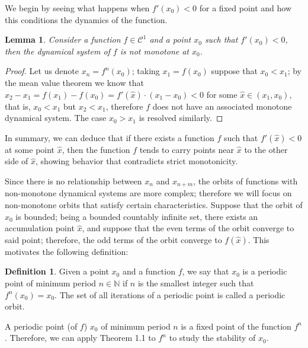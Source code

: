\documentclass[12pt,a4paper]{report}
\newtheorem{lema}{Lemma}[section]
\theoremstyle{definition}
\newtheorem{definicion}{Definition}[section]
\begin{document}
We begin by seeing what happens when $f'(x_0) < 0$ for a fixed point and how this conditions the dynamics of the function.

\begin{lema}
    
Consider a function \( f \in \mathcal{C}^1 \) and a point $x_0$ such that \( f'(x_0) < 0 \), then the dynamical system of $f$ is not monotone at $x_0$.

\end{lema}

\begin{proof}
 Let us denote $x_n = f^n(x_0)$; taking $x_1 = f(x_0)$ suppose that $x_0 < x_1$; by the mean value theorem we know that $x_{2} - x_1 = f(x_1) - f(x_{0}) = f'(\hat{x}) \cdot (x_{1} - x_{0}) < 0$ for some $\hat{x} \in (x_{1}, x_{0})$, that is, $x_0 < x_1$ but $x_{2} < x_1 $, therefore $f$ does not have an associated monotone dynamical system. 
 The case $x_0 > x_1$ is resolved similarly.
\end{proof}

In summary, we can deduce that if there exists a function \( f \) such that \( f'(\hat{x}) < 0 \) at some point \( \hat{x} \), then the function \( f \) tends to carry points near \( \hat{x} \) to the other side of \( \hat{x} \), showing behavior that contradicts strict monotonicity.

Since there is no relationship between $x_n$ and $x_{n+m}$, the orbits of functions with non-monotone dynamical systems are more complex; therefore we will focus on non-monotone orbits that satisfy certain characteristics. Suppose that the orbit of $x_0$ is bounded; being a bounded countably infinite set, there exists an accumulation point $\hat{x}$, and suppose that the even terms of the orbit converge to said point; therefore, the odd terms of the orbit converge to $f(\hat{x})$. This motivates the following definition:

\begin{definicion}

Given a point $x_0$ and a function $f$, we say that $x_0$ is a periodic point of minimum period $n \in \mathbb{N}$ if $n$ is the smallest integer such that $f^n(x_0) = x_0$. The set of all iterations of a periodic point is called a periodic orbit.

\end{definicion}

A periodic point (of $f$) $x_0$ of minimum period $n$ is a fixed point of the function $f^n$. Therefore, we can apply Theorem 1.1 to $f^n$ to study the stability of $x_0$.
\end{document}
